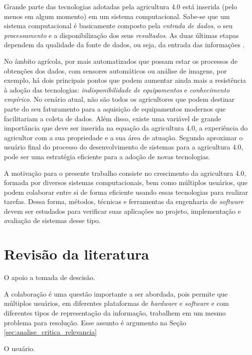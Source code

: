 \documentclass[12pt]{article}
\begin{document}
Grande parte das tecnologias adotadas pela agricultura 4.0 está inserida (pelo menos em algum momento) em um sistema computacional. Sabe-se que um sistema computacional é basicamente composto pela \textit{entrada de dados}, o seu \textit{processamento} e a disponibilização dos seus \textit{resultados}. As duas últimas etapas dependem da qualidade da fonte de dados, ou seja, da entrada das informações \cite{Torres:2013}.

No âmbito agrícola, por mais automatizados que possam estar os processos de obtenções dos dados, com sensores automáticos ou análise de imagens, por exemplo, há dois principais pontos que podem aumentar ainda mais a resistência à adoção das tecnologias: \textit{indisponibilidade de equipamentos} e \textit{conhecimento empírico}. No cenário atual, não são todos os agricultores que podem destinar parte do seu faturamento para a aquisição de equipamentos modernos que facilitariam a coleta de dados. Além disso, existe uma variável de grande importância que deve ser inserida na equação da agricultura 4.0, a experiência do agricultor com a sua propriedade e a sua área de atuação. Segundo  aproximar o usuário final do processo do desenvolvimento de sistemas para a agricultura 4.0, pode ser uma estratégia eficiente para a adoção de novas tecnologias.

A motivação para o presente trabalho consiste no crescimento da agricultura 4.0, formada por diversos sistemas computacionais, bem como múltiplos usuários, que podem colaborar entre si de forma eficiente usando essas tecnologias para realizar tarefas. Dessa forma, métodos, técnicas e ferramentas da engenharia de \textit{software} devem ser estudados para verificar suas aplicações no projeto, implementação e avaliação de sistemas desse tipo.

\section{Revisão da literatura}
\label{sec:revisao_literatura}

O apoio a tomada de descisão.

A colaboração é uma questão importante a ser abordada, pois permite que múltiplos usuários, em diferentes plataformas de \textit{hardware} e \textit{software} e com diferentes tipos de representação da informação, trabalhem em um mesmo problema para resolução. Esse assunto é argumento na Seção \ref{sec:analise_critica_relevancia}

O usuário.
\end{document}
